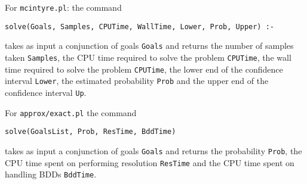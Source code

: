 \documentclass[a4paper,10pt]{scrartcl}
\begin{document}
For \texttt{mcintyre.pl}:
the command 
\begin{verbatim}
solve(Goals, Samples, CPUTime, WallTime, Lower, Prob, Upper) :-
\end{verbatim}
takes as input a conjunction of goals \texttt{Goals} and returns the number of samples taken \texttt{Samples}, 
the CPU time required to solve the problem \texttt{CPUTime}, the wall time required to solve the problem \texttt{CPUTime}, the
lower end of the confidence interval \texttt{Lower}, the estimated probability \texttt{Prob} and the upper end of the confidence interval \texttt{Up}.

For \texttt{approx/exact.pl}
the command 
\begin{verbatim}
solve(GoalsList, Prob, ResTime, BddTime) 
\end{verbatim}
takes as input a conjunction of goals \texttt{Goals} and returns the probability \texttt{Prob}, the CPU time spent on performing resolution \texttt{ResTime} and the CPU time spent on handling BDDs \texttt{BddTime}.
\end{document}
